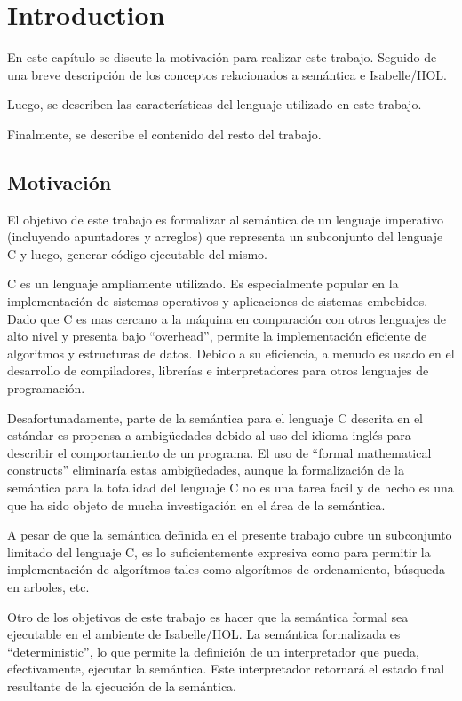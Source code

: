 \chapter{Introduction}\label{chapter:introduction}

En este capítulo se discute la motivación para realizar este trabajo.
Seguido de una breve descripción de los conceptos relacionados a semántica e Isabelle/HOL.

Luego, se describen las características del lenguaje utilizado en este trabajo.

Finalmente, se describe el contenido del resto del trabajo.

\section{Motivación}

El objetivo de este trabajo es formalizar al semántica de un lenguaje imperativo (incluyendo apuntadores y arreglos) que representa un subconjunto del lenguaje C y luego, generar código ejecutable del mismo.

C es un lenguaje ampliamente utilizado.
Es especialmente popular en la implementación de sistemas operativos y aplicaciones de sistemas embebidos.
Dado que C es mas cercano a la máquina en comparación con otros lenguajes de alto nivel y presenta bajo ``overhead'', permite la implementación eficiente de algoritmos y estructuras de datos.
Debido a su eficiencia, a menudo es usado en el desarrollo de compiladores, librerías e interpretadores para otros lenguajes de programación.

Desafortunadamente, parte de la semántica para el lenguaje C descrita en el estándar\cite{c99} es propensa a ambigüedades debido al uso del idioma inglés para describir el comportamiento de un programa.
El uso de ``formal mathematical constructs'' eliminaría estas ambigüedades, aunque la formalización de la semántica para la totalidad del lenguaje C no es una tarea facil y de hecho es una que ha sido objeto de mucha investigación en el área de la semántica.

A pesar de que la semántica definida en el presente trabajo cubre un subconjunto limitado del lenguaje C, es lo suficientemente expresiva como para permitir la implementación de algorítmos tales como algorítmos de ordenamiento, búsqueda en arboles, etc.

Otro de los objetivos de este trabajo es hacer que la semántica formal sea ejecutable en el ambiente de Isabelle/HOL.
La semántica formalizada es ``deterministic'', lo que permite la definición de un interpretador que pueda, efectivamente, ejecutar la semántica.
Este interpretador retornará el estado final resultante de la ejecución de la semántica.


